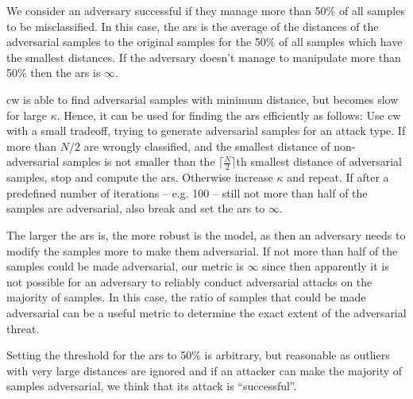 \documentclass[conference]{IEEEtran}
\begin{document}
We consider an adversary successful if they manage more than 50\% of all samples to be misclassified. In this case, the \gls{ars} is the average of the distances of the adversarial samples to the original samples for the 50\% of all samples which have the smallest distances. If the adversary doesn't manage to manipulate more than 50\% then the \gls{ars} is $\infty$.

\gls{cw} is able to find adversarial samples with minimum distance, but becomes slow for large $\kappa$. Hence, it can be used for finding the \gls{ars} efficiently as follows: 
Use \gls{cw} with a small tradeoff, trying to generate adversarial samples for an attack type. If %
 more than $N/2$  are wrongly classified, and
 the smallest distance of non-adversarial samples is not smaller than the $\lceil\frac{N}{2}\rceil$th smallest distance of adversarial samples,
stop and compute the \gls{ars}. Otherwise increase $\kappa$ and repeat. If after a predefined number of iterations -- e.g. 100 -- still not more than half of the samples are adversarial, also break and set the \gls{ars} to $\infty$.

The larger the \gls{ars} is, the more robust is the model, as then an adversary needs to modify the samples more to make them adversarial. If not more than half of the samples could be made adversarial, our metric is $\infty$ since then apparently it is not possible for an adversary to reliably conduct adversarial attacks on the majority of samples. In this case, the ratio of samples that could be made adversarial can be a useful metric to determine the exact extent of the adversarial threat.

Setting the threshold for the \gls{ars} to 50\% is arbitrary, but
 reasonable as outliers with very large distances are ignored and if an attacker can make the majority of samples adversarial, we think that its attack is ``successful''.
\end{document}
